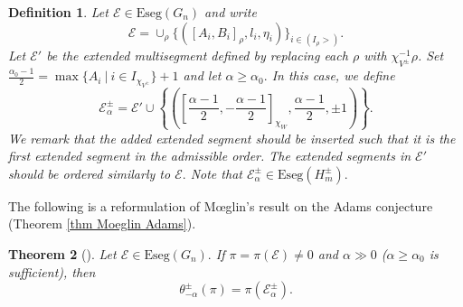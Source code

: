 \documentclass[11pt,letterpaper]{amsart}
\newcommand{\Eseg}{{\mathrm{Eseg}}}
\newcommand{\inv}{^{-1}}
\newcommand{\EE}{\mathcal{E}}
\newtheorem{thm}{Theorem}[section]
\newtheorem{defn}[thm]{Definition}
\numberwithin{equation}{section}
\begin{document}
\begin{defn}\label{defn EE_alpha}
    Let $\EE\in\Eseg(G_n)$ and write
    \[
    \EE = \cup_{\rho}\{ ([A_i,B_i]_{\rho}, l_i, \eta_i) \}_{i \in (I_\rho>)}.
    \]
    Let $\EE'$ be the extended multisegment defined by replacing each $\rho$ with $\chi_{V^\pm}\inv\rho$.
    Set $\frac{\alpha_0-1}{2}=\max\{A_i \ | \ i \in I_{\chi_{V^\pm}} \}+1$ and let $\alpha\geq \alpha_0.$ In this case, we define
    \[
    \EE_\alpha^\pm=\EE'\cup\left\{\left(\left[\frac{\alpha-1}{2},-\frac{\alpha-1}{2}\right]_{\chi_W}, \frac{\alpha-1}{2},\pm1 \right)\right\}.
    \]
    We remark that the added extended segment should be inserted such that it is the first extended segment in the admissible order. The extended segments in $\EE'$ should be ordered similarly to $\EE.$ Note that $\EE_\alpha^\pm\in\Eseg(H_m^\pm).$
\end{defn} 

The following is a reformulation of M{\oe}glin's result on the Adams conjecture (Theorem \ref{thm Moeglin Adams}).

\begin{thm}[{\cite[Proposition 6.2]{HLL25}}]\label{thm theta lift large}
    Let $\EE\in\Eseg(G_n).$
    If $\pi=\pi(\EE)\neq0$ and $\alpha\gg0$ ($\alpha\geq\alpha_0$ is sufficient), then
    \[
    \theta_{-\alpha}^{\pm}(\pi)=\pi(\EE_\alpha^\pm).
    \]
\end{thm}
\end{document}

